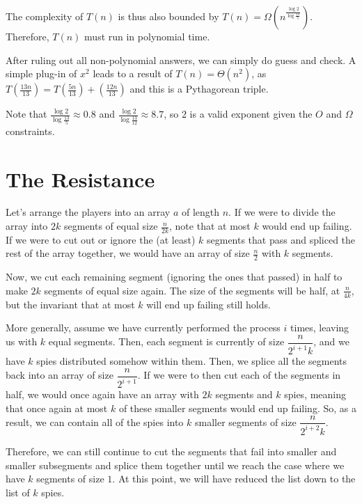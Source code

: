 \documentclass{article}
\begin{document}
\begin{enumerate}[label=\alph*)]
	The complexity of $T(n)$ is thus also bounded by $T(n) = \boxed{\Omega(n^{\frac{\log 2}{\log \frac{13}{5}}})}$. Therefore, $T(n)$ must run in polynomial time.
	
	After ruling out all non-polynomial answers, we can simply do guess and check. A simple plug-in of $x^2$ leads to a result of $\boxed{T(n) = \Theta(n^2)}$, as $T\left(\frac{13n}{13}\right) = T\left(\frac{5n}{13}\right) + \left(\frac{12n}{13}\right)$ and this is a Pythagorean triple.

	Note that $\frac{\log 2}{\log \frac{13}{5}} \approx 0.8$ and $\frac{\log 2}{\log \frac{13}{12}} \approx 8.7$, so $2$ is a valid exponent given the $O$ and $\Omega$ constraints.
\end{enumerate}

\newpage
\section{The Resistance}
Let's arrange the players into an array $a$ of length $n$. If we were to divide the array into $2k$ segments of equal size $\frac{n}{2k}$, note that at most $k$ would end up failing. If we were to cut out or ignore the (at least) $k$ segments that pass and spliced the rest of the array together, we would have an array of size $\frac{n}{2}$ with $k$ segments. 

Now, we cut each remaining segment (ignoring the ones that passed) in half to make $2k$ segments of equal size again. The size of the segments will be half, at $\frac{n}{4k}$, but the invariant that at most $k$ will end up failing still holds.

More generally, assume we have currently performed the process $i$ times, leaving us with $k$ equal segments. Then, each segment is currently of size $\dfrac{n}{2^{i+1}k}$, and we have $k$ spies distributed somehow within them. Then, we splice all the segments back into an array of size $\dfrac{n}{2^{i+1}}$. If we were to then cut each of the segments in half, we would once again have an array with $2k$ segments and $k$ spies, meaning that once again at most $k$ of these smaller segments would end up failing. So, as a result, we can contain all of the spies into $k$ smaller segments of size $\dfrac{n}{2^{i+2}k}$. 

Therefore, we can still continue to cut the segments that fail into smaller and smaller subsegments and splice them together until we reach the case where we have $k$ segments of size $1$. At this point, we will have reduced the list down to the list of $k$ spies.
\end{document}
